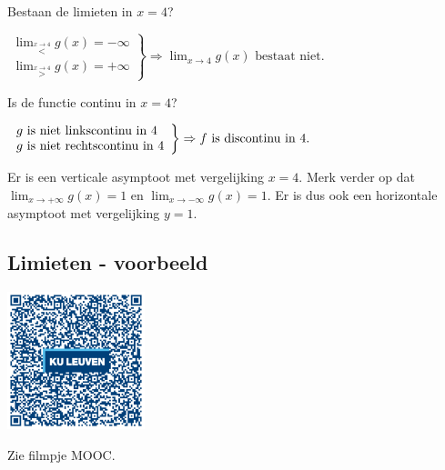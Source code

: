 \begin{voorbeeld}


\begin{figure}[H]
	\centering
	
\end{figure}



Bestaan de limieten in $x=4$?

\begin{math}
\left. \begin{array}{l}
\lim_{\overset{x\rightarrow4}{<}}g(x)=-\infty \\
 \lim_{\overset{x\rightarrow4}{>}}g(x)=+\infty
\end{array}
\right\}
\Rightarrow \lim_{x\to4}g(x) \text{ bestaat niet}.
\end{math}

Is de functie continu in $x=4$?

\begin{math}
\centering
\left. \begin{array}{l}
g \text{ is niet linkscontinu in }4\\
g \text{ is niet rechtscontinu in }4
\end{array}
\right\}
\Rightarrow f \text{ is discontinu in }4.
\end{math}

Er is een verticale asymptoot met vergelijking $x=4$.
Merk verder op dat $\lim_{x\rightarrow+\infty}g(x)=1$ en $\lim_{x\rightarrow-\infty}g(x)=1$.
Er is dus ook een horizontale asymptoot met vergelijking $y=1$.

\end{voorbeeld}

\subsection{Limieten - voorbeeld}


\begin{minipage}{.25\linewidth}
	\raggedright
	\includegraphics[width=4cm]{2_elem_rekenvaardigheden_B/inputs/QR_Code_LIMIETENVOORBEELD_module2new}
\end{minipage}
\begin{minipage}{.7\linewidth}
	Zie filmpje MOOC.
\end{minipage}

